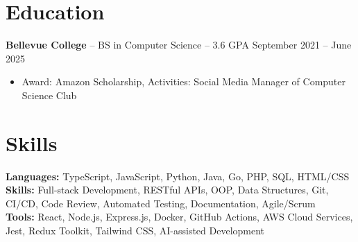 \documentclass[11pt]{article}       %
\begin{document}

\vspace{-18.5pt}

\section*{Education}
\textbf{Bellevue College} -- BS in Computer Science -- 3.6 GPA \hfill September 2021 -- June 2025\\
\vspace{-9pt}
\begin{itemize}
  \item Award: Amazon Scholarship, Activities: Social Media Manager of Computer Science Club
\end{itemize}

\vspace{-18.5pt}

\section*{Skills}
\textbf{Languages:} TypeScript, JavaScript, Python, Java, Go, PHP, SQL, HTML/CSS\\
\textbf{Skills:} Full-stack Development, RESTful APIs, OOP, Data Structures, Git, CI/CD, Code Review, Automated Testing, Documentation, Agile/Scrum\\
\textbf{Tools:} React, Node.js, Express.js, Docker, GitHub Actions, AWS Cloud Services, Jest, Redux Toolkit, Tailwind CSS, AI-assisted Development\\

\vspace{-6.5pt}
\end{document}
